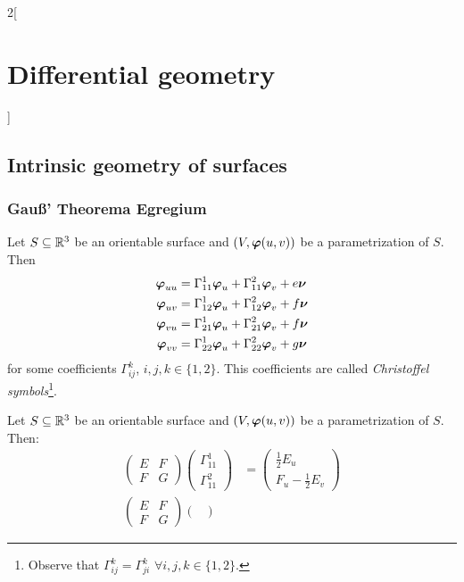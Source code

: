\documentclass[../../../main.tex]{subfiles}
\begin{document}
\begin{multicols}{2}[\section{Differential geometry}]
  \subsection{Intrinsic geometry of surfaces}
  \subsubsection{Gau\ss' Theorema Egregium}
  \begin{definition}
    Let $S\subseteq\mathbb{R}^3$ be an orientable surface and $(V,\boldsymbol{\mathrm{\varphi}}(u,v))$ be a parametrization of $S$. Then
    \begin{align*}
      \boldsymbol{\mathrm{\varphi}}_{uu} & =\Gamma_{11}^1\boldsymbol{\mathrm{\varphi}}_u+\Gamma_{11}^2\boldsymbol{\mathrm{\varphi}}_v+e\boldsymbol{\mathrm{\nu}} \\
      \boldsymbol{\mathrm{\varphi}}_{uv} & =\Gamma_{12}^1\boldsymbol{\mathrm{\varphi}}_u+\Gamma_{12}^2\boldsymbol{\mathrm{\varphi}}_v+f\boldsymbol{\mathrm{\nu}} \\
      \boldsymbol{\mathrm{\varphi}}_{vu} & =\Gamma_{21}^1\boldsymbol{\mathrm{\varphi}}_u+\Gamma_{21}^2\boldsymbol{\mathrm{\varphi}}_v+f\boldsymbol{\mathrm{\nu}} \\
      \boldsymbol{\mathrm{\varphi}}_{vv} & =\Gamma_{22}^1\boldsymbol{\mathrm{\varphi}}_u+\Gamma_{22}^2\boldsymbol{\mathrm{\varphi}}_v+g\boldsymbol{\mathrm{\nu}}
    \end{align*}
    for some coefficients $\Gamma_{ij}^k$, $i,j,k\in\{1,2\}$. This coefficients are called \emph{Christoffel symbols}\footnote{Observe that $\Gamma_{ij}^k=\Gamma_{ji}^k$  $\forall i,j,k\in\{1,2\}$.}.
  \end{definition}
  \begin{proposition}
    Let $S\subseteq\mathbb{R}^3$ be an orientable surface and $(V,\boldsymbol{\mathrm{\varphi}}(u,v))$ be a parametrization of $S$. Then:
    \begin{align*}
      \begin{pmatrix}
        E & F \\
        F & G
      \end{pmatrix}
      \begin{pmatrix}
        \Gamma_{11}^1 \\
        \Gamma_{11}^2
      \end{pmatrix} & =\begin{pmatrix}
                         \frac{1}{2}E_u \\
                         F_u-\frac{1}{2}E_v
                       \end{pmatrix}  \\
      \begin{pmatrix}
        E & F \\
        F & G
      \end{pmatrix}
      \begin{pmatrix}

\end{pmatrix}
\end{align*}
\end{proposition}
\end{multicols}
\end{document}
